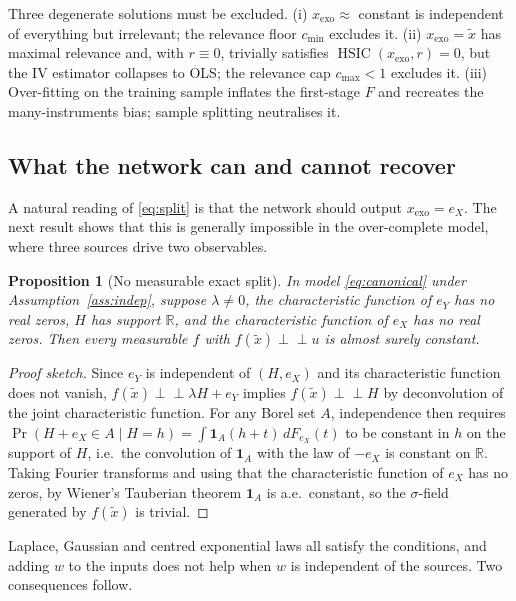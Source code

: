 \documentclass[11pt]{article}
\newtheorem{proposition}{Proposition}
\theoremstyle{definition}
\theoremstyle{remark}
\newcommand{\HSIC}{\operatorname{HSIC}}
\newcommand{\indep}{\perp\!\!\!\perp}
\newcommand{\xexo}{x_{\mathrm{exo}}}
\newcommand{\tx}{\tilde{x}}
\begin{document}
Three degenerate solutions must be excluded. (i) $\xexo\approx$ constant is independent of
everything but irrelevant; the relevance floor $c_{\min}$ excludes it. (ii) $\xexo = \tx$ has
maximal relevance and, with $r\equiv 0$, trivially satisfies $\HSIC(\xexo,r)=0$, but the IV estimator
collapses to OLS; the relevance cap $c_{\max}<1$ excludes it. (iii) Over-fitting on the training
sample inflates the first-stage $F$ and recreates the many-instruments bias; sample splitting
neutralises it.

\subsection{What the network can and cannot recover}\label{sec:cannot}

A natural reading of \eqref{eq:split} is that the network should output $\xexo = e_X$. The next
result shows that this is generally impossible in the over-complete model, where three sources
drive two observables.

\begin{proposition}[No measurable exact split]\label{prop:nosplit}
In model \eqref{eq:canonical} under Assumption~\ref{ass:indep}, suppose $\lambda\neq0$, the
characteristic function of $e_Y$ has no real zeros, $H$ has support $\mathbb{R}$, and the
characteristic function of $e_X$ has no real zeros. Then every measurable $f$ with
$f(\tx)\indep u$ is almost surely constant.
\end{proposition}

\begin{proof}[Proof sketch]
Since $e_Y$ is independent of $(H,e_X)$ and its characteristic function does not vanish,
$f(\tx)\indep \lambda H + e_Y$ implies $f(\tx)\indep H$ by deconvolution of the joint characteristic
function. For any Borel set $A$, independence then requires
$\Pr(H+e_X\in A\mid H=h)=\int \mathbf{1}_A(h+t)\,dF_{e_X}(t)$ to be constant in $h$ on the support
of $H$, i.e.\ the convolution of $\mathbf{1}_A$ with the law of $-e_X$ is constant on $\mathbb{R}$.
Taking Fourier transforms and using that the characteristic function of $e_X$ has no zeros, by
Wiener's Tauberian theorem $\mathbf{1}_A$ is a.e.\ constant, so the $\sigma$-field generated by
$f(\tx)$ is trivial.
\end{proof}

Laplace, Gaussian and centred exponential laws all satisfy the conditions, and adding $w$ to the
inputs does not help when $w$ is independent of the sources. Two consequences follow.
\end{document}
